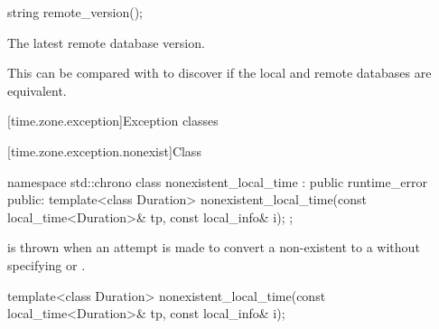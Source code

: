 %
\begin{itemdecl}
string remote_version();
\end{itemdecl}

\begin{itemdescr}
\pnum
\returns
The latest remote database version.

\begin{note}
This can be compared with 
to discover if the local and remote databases are equivalent.
\end{note}
\end{itemdescr}

[time.zone.exception]{Exception classes}

[time.zone.exception.nonexist]{Class }

\begin{codeblock}
namespace std::chrono {
  class nonexistent_local_time : public runtime_error {
  public:
    template<class Duration>
      nonexistent_local_time(const local_time<Duration>& tp, const local_info& i);
  };
}
\end{codeblock}

\pnum
{} is thrown when
an attempt is made
to convert a non-existent  to a 
without specifying  or .

%
\begin{itemdecl}
template<class Duration>
  nonexistent_local_time(const local_time<Duration>& tp, const local_info& i);
\end{itemdecl}

